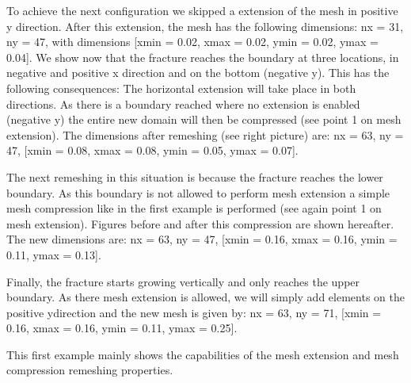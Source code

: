\documentclass[letterpaper,10pt,english]{sphinxmanual}
\begin{document}
\sphinxAtStartPar
To achieve the next configuration we skipped a extension of the mesh in positive y direction. After this extension, the
mesh has the following dimensions: nx = 31, ny = 47, with dimensions {[}xmin = \sphinxhyphen{}0.02, xmax = 0.02, ymin = \sphinxhyphen{}0.02, ymax =
0.04{]}. We show now that the fracture reaches the boundary at three locations, in negative and positive x direction and
on the bottom (negative y). This has the following consequences: The horizontal extension will take place in both
directions. As there is a boundary reached where no extension is enabled (negative y) the entire new domain will then be
compressed (see point 1 on mesh extension). The dimensions after re\sphinxhyphen{}meshing (see right picture) are: nx = 63, ny = 47,
{[}xmin = \sphinxhyphen{}0.08, xmax = 0.08, ymin = \sphinxhyphen{}0.05, ymax = 0.07{]}.

\noindent{}

\noindent{}

\sphinxAtStartPar
The next re\sphinxhyphen{}meshing in this situation is because the fracture reaches the lower boundary. As this boundary is not
allowed to perform mesh extension a simple mesh compression like in the first example is performed (see again point 1 on
mesh extension). Figures before and after this compression are shown hereafter. The new dimensions are: nx = 63, ny =
47, {[}xmin = \sphinxhyphen{}0.16, xmax = 0.16, ymin = \sphinxhyphen{}0.11, ymax = 0.13{]}.

\noindent{}

\noindent{}

\sphinxAtStartPar
Finally, the fracture starts growing vertically and only reaches the upper boundary. As there mesh extension is allowed,
we will simply add elements on the positive y\sphinxhyphen{}direction and the new mesh is given by:  nx = 63, ny = 71, {[}xmin = \sphinxhyphen{}0.16,
xmax = 0.16, ymin = \sphinxhyphen{}0.11, ymax = 0.25{]}.

\noindent{}

\noindent{}

\sphinxAtStartPar
This first example mainly shows the capabilities of the mesh extension and mesh compression re\sphinxhyphen{}meshing properties.
\end{document}
